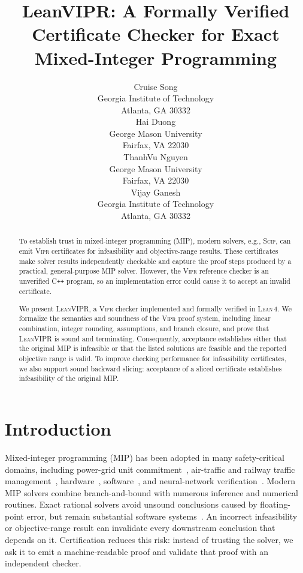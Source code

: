 \documentclass{article}
\title{LeanVIPR: A Formally Verified Certificate Checker for Exact Mixed-Integer Programming}
\author{
    Cruise Song \\
    Georgia Institute of Technology\\
    Atlanta, GA 30332\\
    \And
    Hai Duong \\
    George Mason University\\
    Fairfax, VA 22030\\
    \AND
    ThanhVu Nguyen\\
    George Mason University\\
    Fairfax, VA 22030\\
    \And
    Vijay Ganesh \\
    Georgia Institute of Technology\\
    Atlanta, GA 30332\\
}
\newcommand{\tool}{\textsc{LeanVIPR}}
\newcommand{\scip}{\textsc{Scip}}
\newcommand{\vipr}{\textsc{Vipr}}
\begin{document}
\maketitle


\begin{abstract}
  To establish trust in mixed-integer programming (MIP), modern solvers, e.g., \scip{}, can emit \vipr{} certificates for infeasibility and objective-range results.
  These certificates make solver results independently checkable and capture the proof steps produced by a practical, general-purpose MIP solver.
  However, the \vipr{} reference checker is an unverified C\texttt{++} program, so an implementation error could cause it to accept an invalid certificate.

  We present \tool{}, a \vipr{} checker implemented and formally verified in \textsc{Lean\,4}.
  We formalize the semantics and soundness of the \vipr{} proof system, including linear combination, integer rounding, assumptions, and branch closure, and prove that \tool{} is sound and terminating.
  Consequently, acceptance establishes either that the original MIP is infeasible or that the listed solutions are feasible and the reported objective range is valid.
  To improve checking performance for infeasibility certificates, we also support sound backward slicing: acceptance of a sliced certificate establishes infeasibility of the original MIP.
\end{abstract}


\section{Introduction}\label{sec:intro}

Mixed-integer programming (MIP) has been adopted in many safety-critical domains, including power-grid unit commitment~\citep{knueven2020mixed}, air-traffic and railway traffic management~\citep{lamorgese2019noncompact}, hardware~\citep{huang2021cosa}, software~\citep{wang2023synthesizing}, and neural-network verification~\citep{tjeng2017evaluating,duong2023dpll,duong2024harnessing,duong2025neuralsat,duong2025neuralsat2,le2025fggm,le2026verifying,le2026neural,le2026formal,duong2026verifying,duong2026verifying2,duong2026verifying3,duong2026clad,duong2026zonogpt,duong2026towards,duong2026generating,duong2026compositional}.
Modern MIP solvers combine branch-and-bound with numerous inference and numerical routines.
Exact rational solvers avoid unsound conclusions caused by floating-point error, but remain substantial software systems~\citep{cook2013hybrid,eifler2023computational}.
An incorrect infeasibility or objective-range result can invalidate every downstream conclusion that depends on it.
Certification reduces this risk: instead of trusting the solver, we ask it to emit a machine-readable proof and validate that proof with an independent checker.
\end{document}
